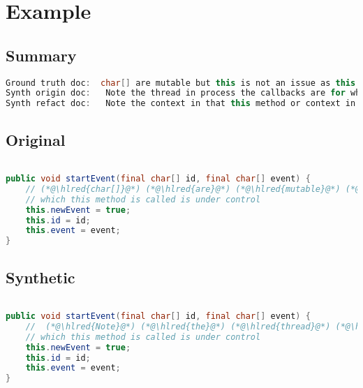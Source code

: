 \documentclass[11pt]{article}
\DeclareRobustCommand{\hlred}[1]{{\sethlcolor{YellowOrange}\hl{#1}}}
\begin{document}
  \pagebreak
  \section{Example}
  \subsection{Summary}

  \begin{lstlisting}[language=java]
Ground truth doc:  char[] are mutable but this is not an issue as this class is package-protected and the code from
Synth origin doc:   Note the thread in process the callbacks are for which event listeners and thus that it identifies a
Synth refact doc:   Note the context in that this method or context in other code is ignored since only that method called
  \end{lstlisting}

  \subsection{Original}
  \begin{lstlisting}[language=java]

public void startEvent(final char[] id, final char[] event) {
    // (*@\hlred{char[]}@*) (*@\hlred{are}@*) (*@\hlred{mutable}@*) (*@\hlred{but}@*) (*@\hlred{this}@*) (*@\hlred{is}@*) (*@\hlred{not}@*) (*@\hlred{an}@*) (*@\hlred{issue}@*) (*@\hlred{as}@*) (*@\hlred{this}@*) (*@\hlred{class}@*) (*@\hlred{is}@*) (*@\hlred{package-protected}@*) (*@\hlred{and}@*) (*@\hlred{the}@*) (*@\hlred{code}@*) (*@\hlred{from}@*)
    // which this method is called is under control
    this.newEvent = true;
    this.id = id;
    this.event = event;
}
  \end{lstlisting}
  \subsection{Synthetic}

  \begin{lstlisting}[language=java]

public void startEvent(final char[] id, final char[] event) {
    //  (*@\hlred{Note}@*) (*@\hlred{the}@*) (*@\hlred{thread}@*) (*@\hlred{in}@*) (*@\hlred{process}@*) (*@\hlred{the}@*) (*@\hlred{callbacks}@*) (*@\hlred{are}@*) (*@\hlred{for}@*) (*@\hlred{which}@*) (*@\hlred{event}@*) (*@\hlred{listeners}@*) (*@\hlred{and}@*) (*@\hlred{thus}@*) (*@\hlred{that}@*) (*@\hlred{it}@*) (*@\hlred{identifies}@*) (*@\hlred{a}@*)
    // which this method is called is under control
    this.newEvent = true;
    this.id = id;
    this.event = event;
}
  \end{lstlisting}
\end{document}
